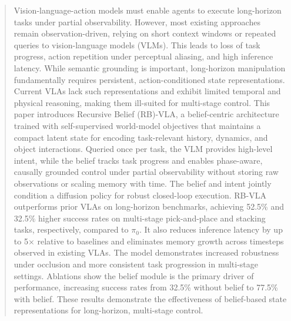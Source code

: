 \documentclass[conference]{IEEEtran}
\begin{document}
\begin{abstract}


Vision-language-action models must enable agents to execute long-horizon tasks under partial observability. However, most existing approaches remain observation-driven, relying on short context windows or repeated queries to vision-language models (VLMs). This leads to loss of task progress, action repetition under perceptual aliasing, and high inference latency. While semantic grounding is important, long-horizon manipulation fundamentally requires persistent, action-conditioned state representations. Current VLAs lack such representations and exhibit limited temporal and physical reasoning, making them ill-suited for multi-stage control.
This paper introduces Recursive Belief (RB)-VLA, a belief-centric architecture trained with self-supervised world-model objectives that maintains a compact latent state for encoding task-relevant history, dynamics, and object interactions. Queried once per task, the VLM provides high-level intent, while the belief tracks task progress and enables phase-aware, causally grounded control under partial observability without storing raw observations or scaling memory with time. The belief and intent jointly condition a diffusion policy for robust closed-loop execution.
RB-VLA outperforms prior VLAs on long-horizon benchmarks, achieving 52.5\% and 32.5\% higher success rates on multi-stage pick-and-place and stacking tasks, respectively, compared to $\pi_0$. It also reduces inference latency by up to 5× relative to baselines and eliminates memory growth across timesteps observed in existing VLAs. The model demonstrates increased robustness under occlusion and more consistent task progression in multi-stage settings. Ablations show the belief module is the primary driver of performance, increasing success rates from 32.5\% without belief to 77.5\% with belief. These results demonstrate the effectiveness of belief-based state representations for long-horizon, multi-stage control.

\end{abstract}
\end{document}
